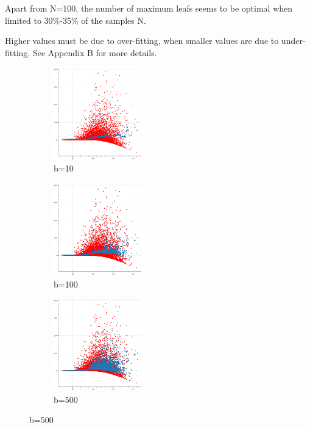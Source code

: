 \documentclass[english,11pt,openany]{report}
\theoremstyle{definition}
\theoremstyle{plain}
\theoremstyle{definition}
\begin{document}
Apart from N=100, the number of maximum leafs seems to be optimal when limited to 30\%-35\% of the samples N.

Higher values must be due to over-fitting, when smaller values are due to under-fitting.
See Appendix B for more details. 



\begin{figure}[H]
	\centering
	\begin{subfigure}[t]{0.3\textwidth}
		\includegraphics[width=40mm]{RF_analysis/RF_10.png}
		\caption{b=10}
		\label{fig:a} %
	\end{subfigure}
	\begin{subfigure}[t]{0.3\textwidth}
		\includegraphics[width=40mm]{RF_analysis/RF_100.png}
		\caption{b=100}
		\label{fig:b}
	\end{subfigure}
	\begin{subfigure}[t]{0.3\textwidth}
		\includegraphics[width=40mm]{RF_analysis/RF_500.png}
		\caption{b=500}
		\label{fig:c}
	\end{subfigure}	
	

\end{figure}
\end{document}
